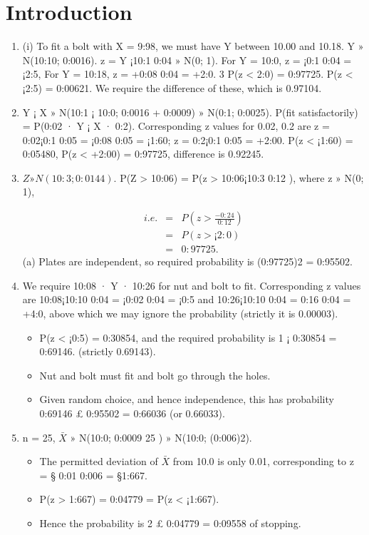 \documentclass[a4paper,12pt]{article}
\begin{document}
\section{Introduction}
\begin{enumerate}
\item (i) To fit a bolt with X = 9:98, we must have Y between 10.00 and 10.18.
Y » N(10:10; 0:0016). z = Y ¡10:1
0:04 » N(0; 1).
For Y = 10:0, z = ¡0:1
0:04 = ¡2:5,
For Y = 10:18, z = +0:08
0:04 = +2:0.
3
P(z < 2:0) = 0:97725. P(z < ¡2:5) = 0:00621.
We require the difference of these, which is 0.97104.
\item  Y ¡ X » N(10:1 ¡ 10:0; 0:0016 + 0:0009) » N(0:1; 0:0025).
P(fit satisfactorily) = P(0:02 · Y ¡ X · 0:2). Corresponding z values for
0.02, 0.2 are z = 0:02¡0:1
0:05 = ¡0:08
0:05 = ¡1:60; z = 0:2¡0:1
0:05 = +2:00.
P(z < ¡1:60) = 0:05480, P(z < +2:00) = 0:97725, difference is 0.92245.
\item  $Z » N(10:3; 0:0144)$. P(Z > 10:06) = P(z > 10:06¡10:3
0:12 ), where z » N(0; 1),

\begin{eqnarray}
i.e. &=& P(z > \frac{-0:24}{0:12} ) \\
&=& P(z > ¡2:0) \\ 
&=& 0:97725.
\end{eqnarray}
(a) Plates are independent, so required probability is (0:97725)2 = 0:95502.
\item We require 10:08 · Y · 10:26 for nut and bolt to fit. Corresponding z values
are 10:08¡10:10
0:04 = ¡0:02
0:04 = ¡0:5 and 10:26¡10:10
0:04 = 0:16
0:04 = +4:0, above which we
may ignore the probability (strictly it is 0.00003). 
\begin{itemize}
\item P(z < ¡0:5) = 0:30854,
and the required probability is 1 ¡ 0:30854 = 0:69146. (strictly 0.69143).
\item Nut and bolt must fit and bolt go through the holes.
\item Given random choice,
and hence independence, this has probability 0:69146 £ 0:95502 = 0:66036
(or 0.66033).
\end{itemize}
\item n = 25, $\bar{X}$ » N(10:0; 0:0009
25 ) » N(10:0; (0:006)2).
\begin{itemize}
\item The permitted deviation of $\bar{X}$ from 10.0 is only 0.01, corresponding to
z = § 0:01
0:006 = §1:667.
\item P(z > 1:667) = 0:04779 = P(z < ¡1:667).
\item Hence the probability is 2 £ 0:04779 = 0:09558 of stopping.
\end{itemize}
\end{enumerate}
\end{document}
